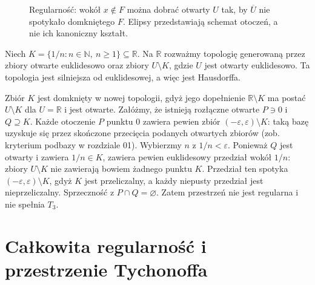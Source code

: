 \begin{figure}[htbp]
\centering
{}
\caption{Regularność: wokół $x\notin F$ można dobrać otwarty
$U$ tak, by $\overline U$ nie spotykało domkniętego $F$.
Elipsy przedstawiają schemat otoczeń, a nie ich kanoniczny kształt.}
\label{fig:topog-regularnosc}
\end{figure}

\begin{przyklad}
\label{ex:topog-k-topologia}
Niech $K=\{1/n:n\in\mathbb N,\ n\ge1\}\subseteq\mathbb R$.
Na $\mathbb R$ rozważmy topologię generowaną przez
zbiory otwarte euklidesowo oraz zbiory $U\setminus K$,
gdzie $U$ jest otwarty euklidesowo. Ta topologia jest
silniejsza od euklidesowej, a więc jest Hausdorffa.

Zbiór $K$ jest domknięty w nowej topologii, gdyż jego dopełnienie
$\mathbb R\setminus K$ ma postać $U\setminus K$ dla
$U=\mathbb R$ i jest otwarte. Załóżmy, że istnieją rozłączne
otwarte $P\ni0$ i $Q\supseteq K$. Każde otoczenie $P$ punktu $0$
zawiera pewien zbiór $(-\varepsilon,\varepsilon)\setminus K$:
taką bazę uzyskuje się przez skończone przecięcia podanych
otwartych zbiorów (zob. kryterium podbazy w rozdziale 01).
Wybierzmy $n$ z $1/n<\varepsilon$.
Ponieważ $Q$ jest otwarty i zawiera $1/n\in K$, zawiera
pewien euklidesowy przedział wokół $1/n$: zbiory
$U\setminus K$ nie zawierają bowiem żadnego punktu $K$.
Przedział ten spotyka $(-\varepsilon,\varepsilon)\setminus K$,
gdyż $K$ jest przeliczalny, a każdy niepusty przedział
jest nieprzeliczalny. Sprzeczność z $P\cap Q=\varnothing$.
Zatem przestrzeń nie jest regularna i nie spełnia $T_3$.
\end{przyklad}

\section{Całkowita regularność i przestrzenie Tychonoffa}
\label{sec:topog-tych}

